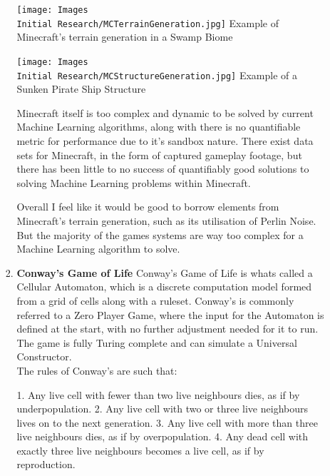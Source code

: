 \begin{flushleft}
\begin{enumerate}
\begin{enumerate}
\begin{enumerate}
                            \texttt{[image: Images\\Initial Research/MCTerrainGeneration.jpg]}
                            Example of Minecraft's terrain generation in a Swamp Biome
                            \vspace{0.2cm}

                            \texttt{[image: Images\\Initial Research/MCStructureGeneration.jpg]}
                            Example of a Sunken Pirate Ship Structure
                            \vspace{0.2cm}

                            Minecraft itself is too complex and dynamic to be solved by current Machine Learning algorithms, along with there is no quantifiable 
                            metric for performance due to it's sandbox nature. There exist data sets for Minecraft, in the form of captured gameplay footage, but
                            there has been little to no success of quantifiably good solutions to solving Machine Learning problems within Minecraft.

                            Overall I feel like it would be good to borrow elements from Minecraft's terrain generation, such as its utilisation of Perlin Noise.
                            But the majority of the games systems are way too complex for a Machine Learning algorithm to solve. 

                        \item {\large \textbf{Conway's Game of Life}}
                            Conway's Game of Life is whats called a Cellular Automaton, which is a discrete computation model formed from a grid of cells along with 
                            a ruleset. Conway's is commonly referred to a Zero Player Game, where the input for the Automaton is defined at the start, with no
                            further adjustment needed for it to run. The game is fully Turing complete and can simulate a Universal Constructor. \\
                            \vspace{0.2cm}
                            The rules of Conway's are such that:

                            \begin{center}
                                1. Any live cell with fewer than two live neighbours dies, as if by underpopulation.
                                2. Any live cell with two or three live neighbours lives on to the next generation.
                                3. Any live cell with more than three live neighbours dies, as if by overpopulation.
                                4. Any dead cell with exactly three live neighbours becomes a live cell, as if by reproduction.
                            \end{center}


\end{enumerate}
\end{enumerate}
\end{enumerate}
\end{flushleft}
